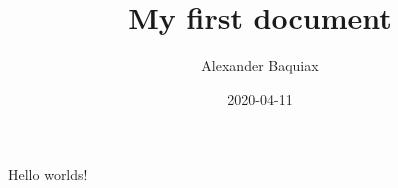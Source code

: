 \documentclass{article}
\title{My first document}
\date{2020-04-11}
\author{Alexander Baquiax}
\begin{document}
\maketitle
\newpage
{}

Hello worlds!
\end{document}
